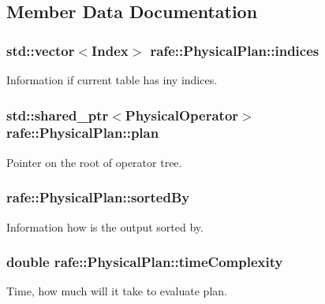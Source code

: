 \subsection{Member Data Documentation}
\hypertarget{classrafe_1_1_physical_plan_a612093270ee90c36a303533cf3ea4f48}{
\subsubsection[{indices}]{\setlength{\rightskip}{0pt plus 5cm}std\+::vector$<${\bf Index}$>$ rafe\+::\+Physical\+Plan\+::indices}}\label{classrafe_1_1_physical_plan_a612093270ee90c36a303533cf3ea4f48}
Information if current table has iny indices. \hypertarget{classrafe_1_1_physical_plan_ac90f368fe33c419642571aa4573856c1}{
\subsubsection[{plan}]{\setlength{\rightskip}{0pt plus 5cm}std\+::shared\+\_\+ptr$<${\bf Physical\+Operator}$>$ rafe\+::\+Physical\+Plan\+::plan}}\label{classrafe_1_1_physical_plan_ac90f368fe33c419642571aa4573856c1}
Pointer on the root of operator tree. \hypertarget{classrafe_1_1_physical_plan_ada9f8409dc126ccc378c91a507e83854}{
\subsubsection[{sorted\+By}]{ rafe\+::\+Physical\+Plan\+::sorted\+By}}\label{classrafe_1_1_physical_plan_ada9f8409dc126ccc378c91a507e83854}
Information how is the output sorted by. \hypertarget{classrafe_1_1_physical_plan_a1f5748b98d9ae211fc653ad0de0fe2a2}{
\subsubsection[{time\+Complexity}]{\setlength{\rightskip}{0pt plus 5cm}double rafe\+::\+Physical\+Plan\+::time\+Complexity}}\label{classrafe_1_1_physical_plan_a1f5748b98d9ae211fc653ad0de0fe2a2}
Time, how much will it take to evaluate plan. 

